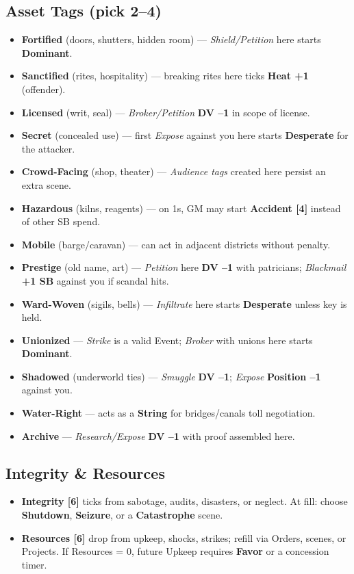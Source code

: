 \documentclass[10pt]{article}
\begin{document}
    \subsection{Asset Tags (pick 2--4)}
    \begin{itemize}
      \item \textbf{Fortified} (doors, shutters, hidden room) --- \emph{Shield/Petition} here starts \textbf{Dominant}.
      \item \textbf{Sanctified} (rites, hospitality) --- breaking rites here ticks \textbf{Heat +1} (offender).
      \item \textbf{Licensed} (writ, seal) --- \emph{Broker/Petition} \textbf{DV --1} in scope of license.
      \item \textbf{Secret} (concealed use) --- first \emph{Expose} against you here starts \textbf{Desperate} for the attacker.
      \item \textbf{Crowd-Facing} (shop, theater) --- \emph{Audience tags} created here persist an extra scene.
      \item \textbf{Hazardous} (kilns, reagents) --- on 1s, GM may start \textbf{Accident [4]} instead of other SB spend.
      \item \textbf{Mobile} (barge/caravan) --- can act in adjacent districts without penalty.
      \item \textbf{Prestige} (old name, art) --- \emph{Petition} here \textbf{DV --1} with patricians; \emph{Blackmail} \textbf{+1 SB} against you if scandal hits.
      \item \textbf{Ward-Woven} (sigils, bells) --- \emph{Infiltrate} here starts \textbf{Desperate} unless key is held.
      \item \textbf{Unionized} --- \emph{Strike} is a valid Event; \emph{Broker} with unions here starts \textbf{Dominant}.
      \item \textbf{Shadowed} (underworld ties) --- \emph{Smuggle} \textbf{DV --1}; \emph{Expose} \textbf{Position --1} against you.
      \item \textbf{Water-Right} --- acts as a \textbf{String} for bridges/canals toll negotiation.
      \item \textbf{Archive} --- \emph{Research/Expose} \textbf{DV --1} with proof assembled here.
    \end{itemize}
    
    \subsection{Integrity \& Resources}
    \begin{itemize}
      \item \textbf{Integrity [6]} ticks from sabotage, audits, disasters, or neglect. At fill: choose \textbf{Shutdown}, \textbf{Seizure}, or a \textbf{Catastrophe} scene.
      \item \textbf{Resources [6]} drop from upkeep, shocks, strikes; refill via Orders, scenes, or Projects. If Resources = 0, future Upkeep requires \textbf{Favor} or a concession timer.
    \end{itemize}
    
\end{document}
